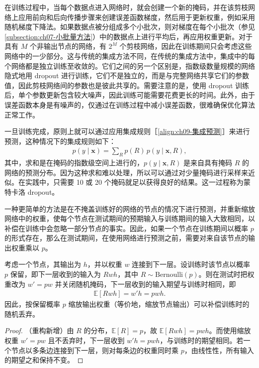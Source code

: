 \documentclass[../../main.tex]{subfiles}
\begin{document}
在训练过程中，当每个数据点进入网络时，就会创建一个新的掩码，并在该剪枝网络上应用前向和后向传播步骤来创建误差函数梯度，然后用于更新权重，例如采用随机梯度下降法。如果数据点被分组成多个小批次，则对梯度在每个小批次（参见\cref{subsection:ch07-小批量方法}）中的数据点上进行平均后，再应用权重更新。对于具有 $M$ 个非输出节点的网络，有 $2^{M}$ 个剪枝网络，因此在训练期间只会考虑这些网络中的一少部分。这与传统的集成方法不同，在传统的集成方法中，集成中的每个网络都是独立训练至收敛的。它们之间的另一个区别是，指数级数量规模的网络隐式地用 dropout 进行训练，它们不是独立的，而是与完整网络共享它们的参数值，因此剪枝网络间的参数也是彼此共享的。需要注意的是，使用 dropout 训练后，单个参数更新包含较大噪声，因此训练可能需要花费更长的时间。此外，由于误差函数本身是有噪声的，仅通过在训练过程中减小误差函数，很难确保优化算法正常工作。

一旦训练完成，原则上就可以通过应用集成规则［\eqref{align:ch09-集成预测}］来进行预测，这种情况下的集成规则如下：
\begin{align}
p(y\mid\boldsymbol{x})=\sum_{R}p(R)\,p(y\mid\boldsymbol{x},R),
\label{align:ch09-dropout集成}
\end{align}
其中，求和是在掩码的指数级空间上进行的，$p(y\mid\boldsymbol{x},R)$ 是来自具有掩码 $R$ 的网络的预测分布。因为这种求和难以处理，所以可以通过对少量掩码进行采样来近似。在实践中，只需要 10 或 20 个掩码就足以获得良好的结果。这一过程称为蒙特卡洛 dropout。

一种更简单的方法是在不掩盖训练好的网络的节点的情况下进行预测，并重新缩放网络中的权重，使每个节点在测试期间的预期输入与训练期间的输入大致相同，以补偿在训练中会忽略一部分节点的事实。因此，如果一个节点在训练期间以概率 $p$ 的形式存在，那么在测试期间，在使用网络进行预测之前，需要对来自该节点的输出权重乘以 $p$。

\begin{proposition}\label{proposition:ch09-dropout缩放}
考虑一个节点，其输出为 $h$，并以权重 $w$ 连接到下一层。设训练时该节点以概率 $p$ 保留，即下一层收到的输入为 $Rwh$，其中 $R\sim\mathrm{Bernoulli}(p)$。则在测试时把权重改为 $w'=pw$ 并关闭随机掩码，下一层收到的输入期望与训练时相同，即
\begin{align*}
\mathbb{E}[Rwh]=w'h=pwh.
\end{align*}
因此，按保留概率 $p$ 缩放输出权重（等价地，缩放节点输出）可以补偿训练时的随机丢弃。
\end{proposition}

\begin{proof}
（重构新增）由 $R$ 的分布，$\mathbb{E}[R]=p$，故 $\mathbb{E}[Rwh]=pwh$。而使用缩放权重 $w'=pw$ 且不丢弃时，下一层收到 $w'h=pwh$，与训练时的期望相同。若一个节点以多条边连接到下一层，则对每条边的权重同时乘 $p$，由线性性，所有输入的期望之和保持不变。
\end{proof}
\end{document}
